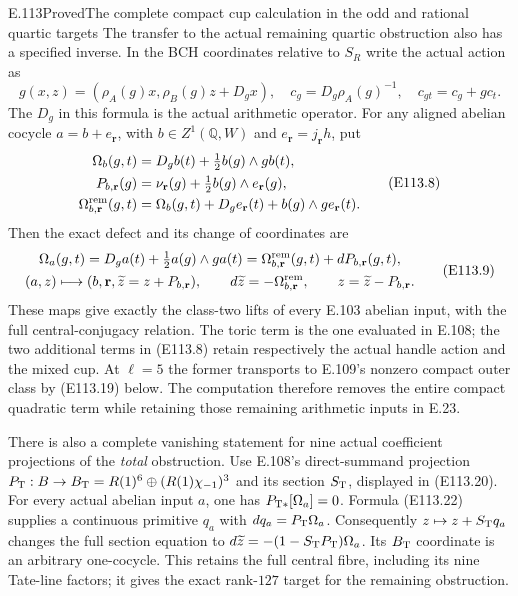 \begin{statement}{E.113}{Proved}{The complete compact cup calculation in the odd and rational quartic targets}
The transfer to the actual remaining quartic obstruction also has
a specified inverse.  In the BCH coordinates relative to $S_R$
write the actual action as
\[
 g(x,z)=(\rho_A(g)x,\rho_B(g)z+D_gx),
 \quad c_g=D_g\rho_A(g)^{-1},
 \quad c_{gt}=c_g+g c_t.
 \tag{E113.7}
\]
The $D_g$ in this formula is the actual arithmetic operator.
For any aligned abelian cocycle $a=b+e_{\mathbf r}$, with
$b\in Z^1(\mathbb Q,W)$ and $e_{\mathbf r}=j_{\mathbf r}h$,
put
\[
 \begin{split}
 \Omega_b(g,t)&=D_gb(t)+\tfrac12b(g)\wedge g b(t),\\
 P_{b,\mathbf r}(g)&=\nu_{\mathbf r}(g)
                         +\tfrac12b(g)\wedge e_{\mathbf r}(g),\\
 \Omega^{\rm rem}_{b,\mathbf r}(g,t)
       &=\Omega_b(g,t)+D_ge_{\mathbf r}(t)
                                +b(g)\wedge g e_{\mathbf r}(t).
 \end{split}
 \tag{E113.8}
\]
Then the exact defect and its change of coordinates are
\[
 \begin{gathered}
 \Omega_a(g,t)=D_ga(t)+\tfrac12a(g)\wedge g a(t)
       =\Omega^{\rm rem}_{b,\mathbf r}(g,t)+dP_{b,\mathbf r}(g,t),\\
 (a,z)\longmapsto(b,\mathbf r,\widetilde z=z+P_{b,\mathbf r}),
 \qquad
 d\widetilde z=-\Omega^{\rm rem}_{b,\mathbf r},
 \qquad z=\widetilde z-P_{b,\mathbf r}.
 \end{gathered}
 \tag{E113.9}
\]
These maps give exactly the class-two lifts of every E.103
abelian input, with the full central-conjugacy relation.
The toric term is the one evaluated in E.108; the two additional
terms in (E113.8) retain respectively the actual handle action
and the mixed cup.  At $\ell=5$ the former transports to E.109's
nonzero compact outer class by (E113.19) below.
The computation therefore removes the entire compact quadratic
term while retaining those remaining arithmetic inputs in E.23.

There is also a complete vanishing statement for nine actual
coefficient projections of the \emph{total} obstruction.
Use E.108's direct-summand projection
$P_{\rm T}:B\to B_{\rm T}=R(1)^6\oplus(R(1)\chi_{-1})^3$
and its section $S_{\rm T}$, displayed in (E113.20).
For every actual abelian input $a$, one has
$P_{{\rm T}*}[\Omega_a]=0$.
Formula (E113.22) supplies a continuous primitive
$q_a$ with $dq_a=P_{\rm T}\Omega_a$.
Consequently $z\mapsto z+S_{\rm T}q_a$ changes the full
section equation to
$d\widetilde z=-(1-S_{\rm T}P_{\rm T})\Omega_a$.
Its $B_{\rm T}$ coordinate is an arbitrary one-cocycle.
This retains the full central fibre, including its nine
Tate-line factors; it gives the exact rank-$127$ target
for the remaining obstruction.
\end{statement}
